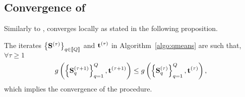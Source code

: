 \iffalse
\begin{remark}[Assignment/Re-estimation trade-off.]
A strategy to tackle this problem would be to first run the vanilla K-means algorithm,
 obtain the matrix of centers $U$ and then encode $U$ as a product of sparse matrices
 using Hierarchical Palm4MSA. This would however prevent us from taking advantage of 
 the expected low complexity product that plays a role in the assignement step of 
 the procedure.
\end{remark}

\todo[inline]{At some point, talk about the trade-off that we are playing with
regarding the cost of the assignment and the cost of the re-estimation procedure.}
\fi

\subsection{Convergence of \qkmeans}
\label{sec:qkmeans:convergence}
Similarly to \kmeans, \qkmeans converges locally as stated in the following proposition.

\begin{proposition}
\label{thm:convergence}
The iterates $\left \lbrace{\mathbf{S}}^{(\tau)} \right \rbrace_{q\in\left \llbracket Q\right \rrbracket}$ and ${\mathbf{t}}^{(\tau)}$ in Algorithm~\ref{algo:qmeans} are such that, $\forall \tau\geq 1$
\begin{equation*}
g\left(\left\{{\mathbf{S}}_q^{(\tau+1)}\right\}_{q=1}^{Q}, {\mathbf{t}}^{(\tau+1)}\right)
\leq g\left(\left\{{\mathbf{S}}_q^{(\tau)}\right\}_{q=1}^{Q}, {\mathbf{t}}^{(\tau)}\right),
\end{equation*}
which implies the convergence of the procedure.

\iffalse
\begin{equation}
\begin{split}
\label{eq:qmean_problem_2}
    g(\rmS_1^{(\tau)}, \ldots,\rmS_\nfactors^{(\tau)}, \rvt^{(\tau)} ) & \\
    = \sum_{k\in\intint{\nclusters}} \sum_{n: \rvt^{(\tau)}_n = k} & \norm{\rvx_n - \rvv^{(\tau)}_k}^2 + \sum_{q\in\intint{\nfactors}} \delta_{\mathcal{E}_q}\left (\rmS_q^{(\tau)}\right ) \\
    \text{ s.t. } \rmV = \prod_{q\in\intint{\nfactors}} & {\rmS_q^{(\tau)}}
\end{split} %
\end{equation}
\fi
\end{proposition}


